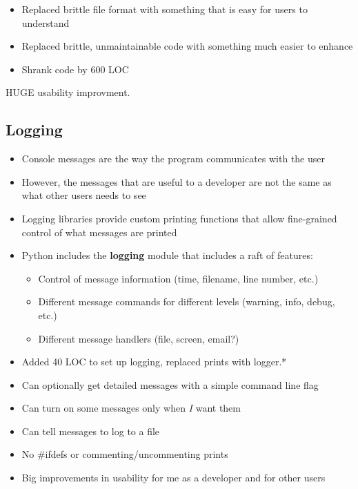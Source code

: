 \documentclass[twocolumn]{article}
\begin{document}
  
  
  \begin{itemize}
    \item Replaced brittle file format with something that is easy for users to understand
    \item Replaced brittle, unmaintainable code with something much easier to enhance
    \item Shrank code by 600 LOC
  \end{itemize}
  HUGE usability improvment.

\subsection{Logging}
  \begin{itemize}
    \item Console messages are the way the program communicates with the user
    \item However, the messages that are useful to a developer are not the
      same as what other users needs to see
    \item Logging libraries provide custom printing functions that allow fine-grained
      control of what messages are printed
    \item Python includes the {\bf logging} module that includes a raft of features:
    \begin{itemize}
      \item Control of message information (time, filename, line number, etc.)
      \item Different message commands for different levels (warning, info, debug, etc.)
      \item Different message handlers (file, screen, email?)
    \end{itemize}
  \end{itemize}

  \begin{itemize}
    \item Added 40 LOC to set up logging, replaced prints with logger.*
    \item Can optionally get detailed messages with a simple command line flag
    \item Can turn on some messages only when \emph{I} want them
    \item Can tell messages to log to a file
    \item No \#ifdefs or commenting/uncommenting prints
    \item Big improvements in usability for me as a developer and for other users
  \end{itemize}
\end{document}
